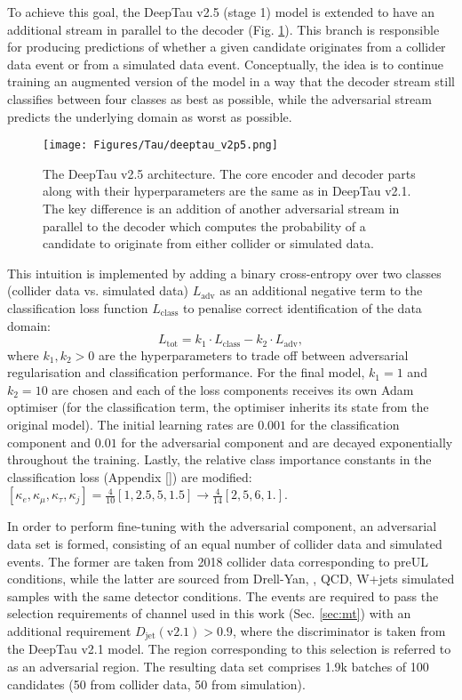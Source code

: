 To achieve this goal, the DeepTau v2.5 (stage 1) model is extended to have an additional stream in parallel to the decoder (Fig. \ref{fig:deeptau_v2p5_arch}). This branch is responsible for producing predictions of whether a given \tauh candidate originates from a collider data event or from a simulated data event. Conceptually, the idea is to continue training an augmented version of the model in a way that the decoder stream still classifies between four classes as best as possible, while the adversarial stream predicts the underlying \tauh domain as worst as possible. 

\begin{figure}[ht!]
    \centering
    \texttt{[image: Figures/Tau/deeptau\_v2p5.png]}
    \caption{The DeepTau v2.5 architecture. The core encoder and decoder parts along with their hyperparameters are the same as in DeepTau v2.1. The key difference is an addition of another adversarial stream in parallel to the decoder which computes the probability of a \tauh candidate to originate from either collider or simulated data.}
    \label{fig:deeptau_v2p5_arch}
\end{figure}

This intuition is implemented by adding a binary cross-entropy over two classes (collider data vs. simulated data) $L_\text{adv}$ as an additional negative term to the classification loss function $L_\text{class}$ to penalise correct identification of the data domain:
\begin{equation}
    L_\text{tot} = k_1 \cdot L_\text{class} - k_2 \cdot L_\text{adv},
\end{equation}\label{eq:adv_loss}
where $k_1, k_2 > 0$ are the hyperparameters to trade off between adversarial regularisation and classification performance. For the final model, $k_1=1$ and $k_2=10$ are chosen and each of the loss components receives its own Adam optimiser (for the classification term, the optimiser inherits its state from the original model). The initial learning rates are $0.001$ for the classification component and $0.01$ for the adversarial component and are decayed exponentially throughout the training. Lastly, the relative class importance constants in the classification loss (Appendix \ref{}) are modified: $[\kappa_e, \kappa_\mu, \kappa_\tau, \kappa_j] = \frac{4}{10}[1, 2.5, 5, 1.5] \to \frac{4}{14}[2, 5, 6, 1.]$.  

In order to perform fine-tuning with the adversarial component, an adversarial data set is formed, consisting of an equal number of collider data and simulated events. The former are taken from 2018 collider data corresponding to preUL conditions, while the latter are sourced from Drell-Yan, \ttbar, QCD, W+jets simulated samples with the same detector conditions. The events are required to pass the selection requirements of \mt channel used in this work (Sec. \ref{sec:mt}) with an additional requirement $D_\text{jet}(\text{v2.1}) > 0.9$, where the discriminator is taken from the DeepTau v2.1 model. The region corresponding to this selection is referred to as an adversarial region. The resulting data set comprises 1.9k batches of 100 \tauh candidates (50 from collider data, 50 from simulation).

